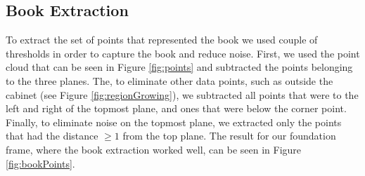 \subsection{Book Extraction}
To extract the set of points that represented the book we used couple of thresholds in order to capture the book and reduce noise. First, we used the point cloud that can be seen in Figure \ref{fig:points} and subtracted the points belonging to the three planes. The, to eliminate other data points, such as outside the cabinet (see Figure \ref{fig:regionGrowing}), we subtracted all points that were to the left and right of the topmost plane, and ones that were below the corner point. Finally, to eliminate noise on the topmost plane, we extracted only the points that had the distance $\geq 1$ from the top plane. The result for our foundation frame, where the book extraction worked well, can be seen in Figure \ref{fig:bookPoints}.

